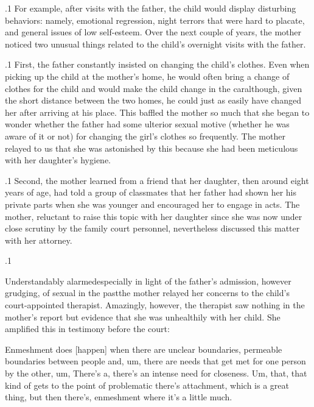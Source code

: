 \documentclass[11pt, twoside]{article}
\begin{document}
{\p.1{%
For example, after visits with the father, the child
would display disturbing behaviors: namely, emotional regression, night terrors that were
hard to placate, and general issues of low self-esteem. Over the next couple of years, the mother noticed two unusual things related to the child’s
overnight visits with the father.
}%

\p.1{%
First, the father constantly insisted on changing the child’s clothes.
Even when picking up the child at the mother’s home, he would often
bring a change of clothes for the child and would make the child change
in the car\mdash{}although, given the short distance between the two homes,
he could just as easily have changed her after arriving at his place. This
baffled the mother so much that she began to wonder whether the father
had some ulterior sexual motive (whether he was aware of it or not) for
changing the girl’s clothes so frequently. The mother relayed to us that
she was astonished by this  because she had been meticulous
with her daughter’s hygiene.
}%

\p.1{%
Second, the mother learned from a friend that her daughter, then
around eight years of age, had told a group of classmates that her father
had shown her his private parts when she was younger and encouraged
her to engage in  acts. The mother, reluctant to raise this topic
with her daughter since she was now under close scrutiny by the family
court personnel, nevertheless discussed this matter with her attorney.
}%

\p.1{%
Understandably alarmed\mdash{}especially in light of the father’s admission, however grudging, of sexual  in the past\mdash{}the
mother relayed her concerns to the child’s court-appointed therapist.
Amazingly, however, the therapist saw nothing in the mother’s report
but evidence that she was unhealthily  with her child. She
amplified this  in testimony before the court:

\begin{blockQuote}
Enmeshment does [happen] when there are unclear boundaries,
permeable boundaries between people and, um, there are needs
that get met for one person by the other, um, There’s a, there’s an
intense need for closeness. Um, that, that kind of gets to the point
of problematic there’s attachment, which is a great thing, but then
there’s, enmeshment where it’s a little much.
\end{blockQuote}

}}
\end{document}
